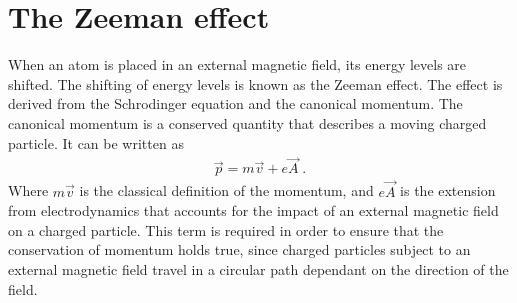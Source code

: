     \section{The Zeeman effect}\label{sec:quadratic_zeeman}
        When an atom is placed in an external magnetic field, its energy levels are shifted. The shifting of energy levels is known as the Zeeman effect. The effect is derived from the Schrodinger equation and the canonical momentum. The canonical momentum is a conserved quantity that describes a moving charged particle. It can be written as 
        \begin{align}
            \vec{p} = m\vec{v} + e\vec{A}\;.
        \end{align}
        \noindent Where $m\vec{v}$ is the classical definition of the momentum, and $e\vec{A}$ is the extension from electrodynamics that accounts for the impact of an external magnetic field on a charged particle. This term is required in order to ensure that the conservation of momentum holds true, since charged particles subject to an external magnetic field travel in a circular path dependant on the direction of the field.\\
        
